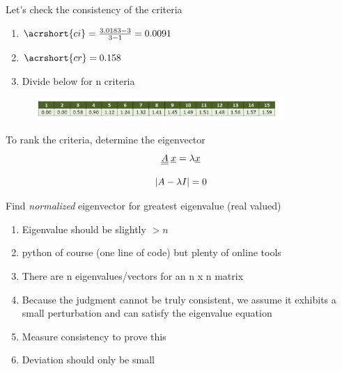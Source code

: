 \documentclass[aspectratio=1610,pdftex,dvipsnames,compress,xcolor={dvipsnames}]{beamer}
\newcommand{\acs}{\acrshort} %
\begin{document}
\begin{frame}{Let's check the consistency of the criteria}
    \begin{enumerate}[series=outerlist,topsep=0pt,itemsep=1pt,leftmargin=*,label=(\arabic*)]
        \item[]$\acs{ci} = \frac{3.0183-3}{3-1} = 0.0091$
        \item[]$\acs{cr} = 0.158$
            \vspace{0.25in}
        \item[]Divide below for n criteria
    \end{enumerate}

    \begin{figure}
        \centering
        \includegraphics[width=0.85\textwidth]{cr.table.jpg}
    \end{figure}
\end{frame}


\begin{frame}{To rank the criteria, determine the eigenvector}
    \begin{equation}
        \LARGE
        \underline{\underline{A}} \: \underline{x} = \lambda \underline{x}
    \end{equation}

    \begin{equation}
        \LARGE
        |A -\lambda I| = 0
    \end{equation}
\end{frame}


\begin{frame}{Find \textit{normalized} eigenvector for greatest eigenvalue (real valued)}
    \begin{enumerate}[series=outerlist,topsep=0pt,itemsep=21pt,leftmargin=*,label=(\arabic*)]
        \item[]Eigenvalue should be slightly $> n$
        \item[]python of course (one line of code) but plenty of online tools 
        \item[]There are n eigenvalues/vectors for an n x n matrix
        \item[]Because the judgment cannot be truly consistent, we assume it exhibits a small perturbation and can satisfy the eigenvalue equation
        \item[]Measure consistency to prove this
        \item[]Deviation should only be small
    \end{enumerate}
\end{frame}
\end{document}
